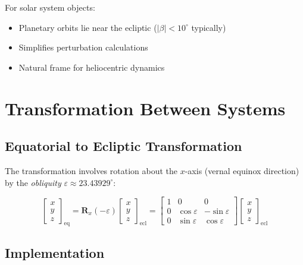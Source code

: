 For solar system objects:
\begin{itemize}
    \item Planetary orbits lie near the ecliptic ($|\beta| < 10^\circ$ typically)
    \item Simplifies perturbation calculations
    \item Natural frame for heliocentric dynamics
\end{itemize}

\section{Transformation Between Systems}

\subsection{Equatorial to Ecliptic Transformation}
The transformation involves rotation about the $x$-axis (vernal equinox direction) by the \textit{obliquity} $\varepsilon \approx 23.43929^\circ$:

\begin{equation}
\begin{bmatrix} x \\ y \\ z \end{bmatrix}_{\text{eq}}
= 
\mathbf{R}_x(-\varepsilon)
\begin{bmatrix} x \\ y \\ z \end{bmatrix}_{\text{ecl}}
=
\begin{bmatrix}
1 & 0 & 0 \\
0 & \cos\varepsilon & -\sin\varepsilon \\
0 & \sin\varepsilon & \cos\varepsilon
\end{bmatrix}
\begin{bmatrix} x \\ y \\ z \end{bmatrix}_{\text{ecl}}
\end{equation}

\subsection{Implementation}

